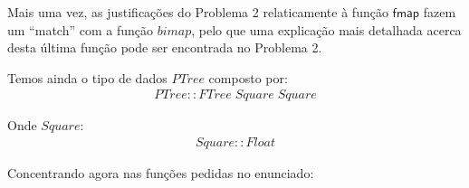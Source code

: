 \documentclass[a4paper]{article}
\newcommand{\Conid}[1]{\mathit{#1}}
\newcommand{\Varid}[1]{\mathit{#1}}
\begin{document}
Mais uma vez, as justificações do Problema 2 relaticamente à função \ensuremath{\mathsf{fmap}} fazem
um ``match'' com a função \ensuremath{\Varid{bimap}}, pelo que uma explicação mais detalhada acerca desta
última função pode ser encontrada no Problema 2.

Temos ainda o tipo de dados \ensuremath{\Conid{PTree}} composto por:
\begin{eqnarray*}
\ensuremath{\Conid{PTree}\mathbin{::}\Conid{FTree}\;\Conid{Square}\;\Conid{Square}}
\end{eqnarray*}

Onde \ensuremath{\Conid{Square}}:
\begin{eqnarray*}
\ensuremath{\Conid{Square}\mathbin{::}\Conid{Float}}
\end{eqnarray*}

\vspace{0.4cm}

Concentrando agora nas funções pedidas no enunciado:
\end{document}
